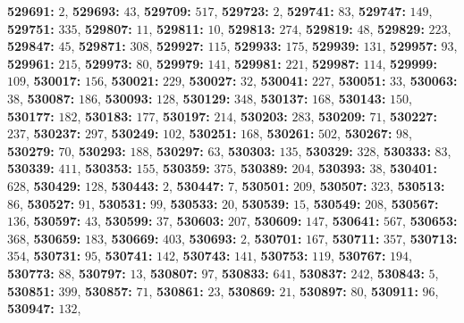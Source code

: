 \textsf{\bfseries 529691:} $2$, \textsf{\bfseries 529693:} $43$, \textsf{\bfseries 529709:} $517$, \textsf{\bfseries 529723:} $2$, \textsf{\bfseries 529741:} $83$, \textsf{\bfseries 529747:} $149$, \textsf{\bfseries 529751:} $335$, \textsf{\bfseries 529807:} $11$, \textsf{\bfseries 529811:} $10$, \textsf{\bfseries 529813:} $274$, \textsf{\bfseries 529819:} $48$, \textsf{\bfseries 529829:} $223$, \textsf{\bfseries 529847:} $45$, \textsf{\bfseries 529871:} $308$, \textsf{\bfseries 529927:} $115$, \textsf{\bfseries 529933:} $175$, \textsf{\bfseries 529939:} $131$, \textsf{\bfseries 529957:} $93$, \textsf{\bfseries 529961:} $215$, \textsf{\bfseries 529973:} $80$, \textsf{\bfseries 529979:} $141$, \textsf{\bfseries 529981:} $221$, \textsf{\bfseries 529987:} $114$, \textsf{\bfseries 529999:} $109$, \textsf{\bfseries 530017:} $156$, \textsf{\bfseries 530021:} $229$, \textsf{\bfseries 530027:} $32$, \textsf{\bfseries 530041:} $227$, \textsf{\bfseries 530051:} $33$, \textsf{\bfseries 530063:} $38$, \textsf{\bfseries 530087:} $186$, \textsf{\bfseries 530093:} $128$, \textsf{\bfseries 530129:} $348$, \textsf{\bfseries 530137:} $168$, \textsf{\bfseries 530143:} $150$, \textsf{\bfseries 530177:} $182$, \textsf{\bfseries 530183:} $177$, \textsf{\bfseries 530197:} $214$, \textsf{\bfseries 530203:} $283$, \textsf{\bfseries 530209:} $71$, \textsf{\bfseries 530227:} $237$, \textsf{\bfseries 530237:} $297$, \textsf{\bfseries 530249:} $102$, \textsf{\bfseries 530251:} $168$, \textsf{\bfseries 530261:} $502$, \textsf{\bfseries 530267:} $98$, \textsf{\bfseries 530279:} $70$, \textsf{\bfseries 530293:} $188$, \textsf{\bfseries 530297:} $63$, \textsf{\bfseries 530303:} $135$, \textsf{\bfseries 530329:} $328$, \textsf{\bfseries 530333:} $83$, \textsf{\bfseries 530339:} $411$, \textsf{\bfseries 530353:} $155$, \textsf{\bfseries 530359:} $375$, \textsf{\bfseries 530389:} $204$, \textsf{\bfseries 530393:} $38$, \textsf{\bfseries 530401:} $628$, \textsf{\bfseries 530429:} $128$, \textsf{\bfseries 530443:} $2$, \textsf{\bfseries 530447:} $7$, \textsf{\bfseries 530501:} $209$, \textsf{\bfseries 530507:} $323$, \textsf{\bfseries 530513:} $86$, \textsf{\bfseries 530527:} $91$, \textsf{\bfseries 530531:} $99$, \textsf{\bfseries 530533:} $20$, \textsf{\bfseries 530539:} $15$, \textsf{\bfseries 530549:} $208$, \textsf{\bfseries 530567:} $136$, \textsf{\bfseries 530597:} $43$, \textsf{\bfseries 530599:} $37$, \textsf{\bfseries 530603:} $207$, \textsf{\bfseries 530609:} $147$, \textsf{\bfseries 530641:} $567$, \textsf{\bfseries 530653:} $368$, \textsf{\bfseries 530659:} $183$, \textsf{\bfseries 530669:} $403$, \textsf{\bfseries 530693:} $2$, \textsf{\bfseries 530701:} $167$, \textsf{\bfseries 530711:} $357$, \textsf{\bfseries 530713:} $354$, \textsf{\bfseries 530731:} $95$, \textsf{\bfseries 530741:} $142$, \textsf{\bfseries 530743:} $141$, \textsf{\bfseries 530753:} $119$, \textsf{\bfseries 530767:} $194$, \textsf{\bfseries 530773:} $88$, \textsf{\bfseries 530797:} $13$, \textsf{\bfseries 530807:} $97$, \textsf{\bfseries 530833:} $641$, \textsf{\bfseries 530837:} $242$, \textsf{\bfseries 530843:} $5$, \textsf{\bfseries 530851:} $399$, \textsf{\bfseries 530857:} $71$, \textsf{\bfseries 530861:} $23$, \textsf{\bfseries 530869:} $21$, \textsf{\bfseries 530897:} $80$, \textsf{\bfseries 530911:} $96$, \textsf{\bfseries 530947:} $132$, 
